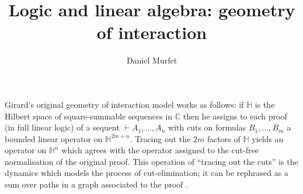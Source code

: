 \documentclass[english,letter paper,12pt,reqno]{article}
\theoremstyle{example}
\numberwithin{equation}{section}
\def\res{\operatorname{Res}}
\begin{document}
\def\ScoreOverhang{1pt}

\def\Res{\res\!}
\newcommand{\ud}[1]{\operatorname{d}\!{#1}}
\newcommand{\Ress}[1]{\res_{#1}\!}
\newcommand{\cat}[1]{\mathcal{#1}}
\newcommand{\lto}{\longrightarrow}
\newcommand{\xlto}[1]{\stackrel{#1}\lto}
\newcommand{\mf}[1]{\mathfrak{#1}}
\newcommand{\md}[1]{\mathscr{#1}}
\newcommand{\church}[1]{\underline{#1}}
\newcommand{\prf}[1]{\underline{#1}}
\newcommand{\den}[1]{\llbracket #1 \rrbracket}
\def\l{\,|\,}
\def\sgn{\textup{sgn}}
\def\cont{\operatorname{cont}}

\title{Logic and linear algebra: geometry of interaction}
\author{Daniel Murfet}

\maketitle

Girard's original geometry of interaction model \cite{girard_goi1} works as follows: if $\mathbb{H}$ is the Hilbert space of square-summable sequences in $\mathbb{C}$ then he assigns to each proof (in full linear logic) of a sequent $\vdash A_1,\ldots,A_n$ with cuts on formulas $B_1,\ldots,B_m$ a bounded linear operator on $\mathbb{H}^{2m+n}$. Tracing out the $2m$ factors of $\mathbb{H}$ yields an operator on $\mathbb{H}^n$ which agrees with the operator assigned to the cut-free normalisation of the original proof. This operation of ``tracing out the cuts'' is the dynamics which models the process of cut-elimination; it can be rephrased as a sum over paths in a graph associated to the proof \cite{danos_regnier2}.
\end{document}
